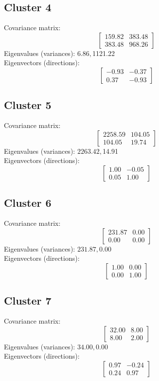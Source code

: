 \documentclass{article}
\begin{document}
\subsection*{Cluster 4}
Covariance matrix:
\[\begin{bmatrix}159.82 & 383.48 \\383.48 & 968.26\end{bmatrix}\]
Eigenvalues (variances): $ 6.86, $1121.22\\
Eigenvectors (directions):
\[\begin{bmatrix}-0.93 & -0.37 \\0.37 & -0.93\end{bmatrix}\]
\subsection*{Cluster 5}
Covariance matrix:
\[\begin{bmatrix}2258.59 & 104.05 \\104.05 & 19.74\end{bmatrix}\]
Eigenvalues (variances): $ 2263.42, $14.91\\
Eigenvectors (directions):
\[\begin{bmatrix}1.00 & -0.05 \\0.05 & 1.00\end{bmatrix}\]
\subsection*{Cluster 6}
Covariance matrix:
\[\begin{bmatrix}231.87 & 0.00 \\0.00 & 0.00\end{bmatrix}\]
Eigenvalues (variances): $ 231.87, $0.00\\
Eigenvectors (directions):
\[\begin{bmatrix}1.00 & 0.00 \\0.00 & 1.00\end{bmatrix}\]
\subsection*{Cluster 7}
Covariance matrix:
\[\begin{bmatrix}32.00 & 8.00 \\8.00 & 2.00\end{bmatrix}\]
Eigenvalues (variances): $ 34.00, $0.00\\
Eigenvectors (directions):
\[\begin{bmatrix}0.97 & -0.24 \\0.24 & 0.97\end{bmatrix}\]
\end{document}
